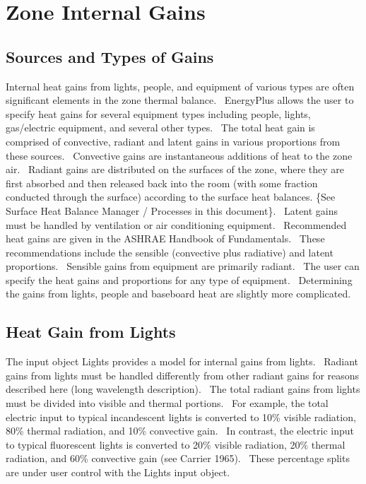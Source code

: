 \section{Zone Internal Gains }\label{zone-internal-gains}

\subsection{Sources and Types of Gains}\label{sources-and-types-of-gains}

Internal heat gains from lights, people, and equipment of various types are often significant elements in the zone thermal balance.~ EnergyPlus allows the user to specify heat gains for several equipment types including people, lights, gas/electric equipment, and several other types.~ The total heat gain is comprised of convective, radiant and latent gains in various proportions from these sources.~ Convective gains are instantaneous additions of heat to the zone air.~ Radiant gains are distributed on the surfaces of the zone, where they are first absorbed and then released back into the room (with some fraction conducted through the surface) according to the surface heat balances. \{See Surface Heat Balance Manager / Processes in this document\}.~ Latent gains must be handled by ventilation or air conditioning equipment.~ Recommended heat gains are given in the ASHRAE Handbook of Fundamentals.~ These recommendations include the sensible (convective plus radiative) and latent proportions.~ Sensible gains from equipment are primarily radiant.~ The user can specify the heat gains and proportions for any type of equipment.~ Determining the gains from lights, people and baseboard heat are slightly more complicated.

\subsection{Heat Gain from Lights}\label{heat-gain-from-lights}

The input object Lights provides a model for internal gains from lights.~ Radiant gains from lights must be handled differently from other radiant gains for reasons described here (long wavelength description).~ The total radiant gains from lights must be divided into visible and thermal portions.~ For example, the total electric input to typical incandescent lights is converted to 10\% visible radiation, 80\% thermal radiation, and 10\% convective gain.~ In contrast, the electric input to typical fluorescent lights is converted to 20\% visible radiation, 20\% thermal radiation, and 60\% convective gain (see Carrier 1965).~ These percentage splits are under user control with the Lights input object.

